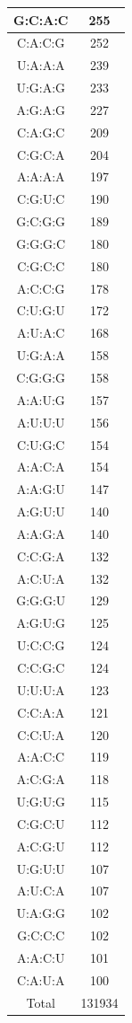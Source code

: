 \begin{center}
\begin{longtable}{c|c}
G:C:A:C & 255 \\ \hline
C:A:C:G & 252 \\ \hline
U:A:A:A & 239 \\ \hline
U:G:A:G & 233 \\ \hline
A:G:A:G & 227 \\ \hline
C:A:G:C & 209 \\ \hline
C:G:C:A & 204 \\ \hline
A:A:A:A & 197 \\ \hline
C:G:U:C & 190 \\ \hline
G:C:G:G & 189 \\ \hline
G:G:G:C & 180 \\ \hline
C:G:C:C & 180 \\ \hline
A:C:C:G & 178 \\ \hline
C:U:G:U & 172 \\ \hline
A:U:A:C & 168 \\ \hline
U:G:A:A & 158 \\ \hline
C:G:G:G & 158 \\ \hline
A:A:U:G & 157 \\ \hline
A:U:U:U & 156 \\ \hline
C:U:G:C & 154 \\ \hline
A:A:C:A & 154 \\ \hline
A:A:G:U & 147 \\ \hline
A:G:U:U & 140 \\ \hline
A:A:G:A & 140 \\ \hline
C:C:G:A & 132 \\ \hline
A:C:U:A & 132 \\ \hline
G:G:G:U & 129 \\ \hline
A:G:U:G & 125 \\ \hline
U:C:C:G & 124 \\ \hline
C:C:G:C & 124 \\ \hline
U:U:U:A & 123 \\ \hline
C:C:A:A & 121 \\ \hline
C:C:U:A & 120 \\ \hline
A:A:C:C & 119 \\ \hline
A:C:G:A & 118 \\ \hline
U:G:U:G & 115 \\ \hline
C:G:C:U & 112 \\ \hline
A:C:G:U & 112 \\ \hline
U:G:U:U & 107 \\ \hline
A:U:C:A & 107 \\ \hline
U:A:G:G & 102 \\ \hline
G:C:C:C & 102 \\ \hline
A:A:C:U & 101 \\ \hline
C:A:U:A & 100 \\ \hline
Total   & 131934 \\ \hline
\end{longtable}
\end{center}








